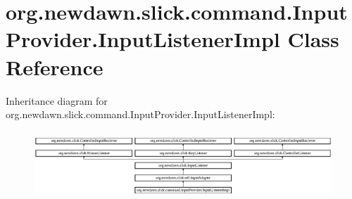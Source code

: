 \hypertarget{classorg_1_1newdawn_1_1slick_1_1command_1_1_input_provider_1_1_input_listener_impl}{}\section{org.\+newdawn.\+slick.\+command.\+Input\+Provider.\+Input\+Listener\+Impl Class Reference}
\label{classorg_1_1newdawn_1_1slick_1_1command_1_1_input_provider_1_1_input_listener_impl}
Inheritance diagram for org.\+newdawn.\+slick.\+command.\+Input\+Provider.\+Input\+Listener\+Impl\+:\begin{figure}[H]
\begin{center}
\leavevmode
\includegraphics[height=2.592592cm]{classorg_1_1newdawn_1_1slick_1_1command_1_1_input_provider_1_1_input_listener_impl}
\end{center}
\end{figure}
